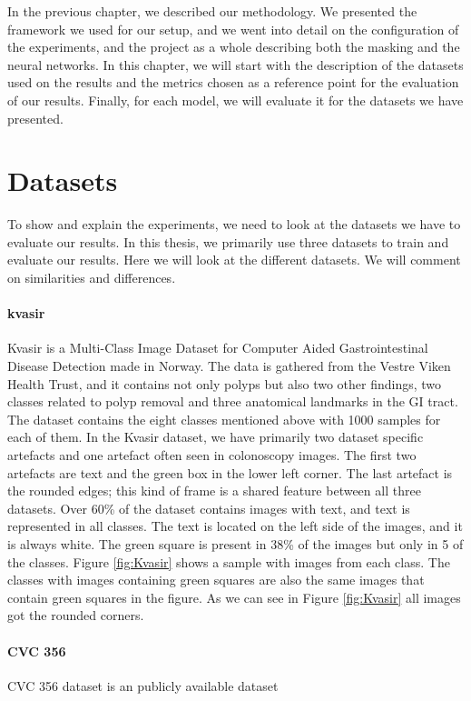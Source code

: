 In the previous chapter, we described our methodology. We presented the framework we used for our setup, and we went into detail on the configuration of the experiments, and the project as a whole describing both the masking and the neural networks. 
In this chapter, we will start with the description of the datasets used on the results and the metrics chosen as a reference point for the evaluation of our results. 
Finally, for each model, we will evaluate it for the datasets we have presented.

\section{Datasets}
To show and explain the experiments, we need to look at the datasets we have to evaluate our results. 
In this thesis, we primarily use three datasets to train and evaluate our results. Here we will look at the different datasets. We will comment on similarities and differences. 


\paragraph{kvasir}
Kvasir is a Multi-Class Image Dataset for Computer Aided Gastrointestinal Disease Detection made in Norway. The data is gathered from the Vestre Viken Health Trust, and it contains not only polyps but also two other findings, two classes related to polyp removal and three anatomical landmarks in the GI tract.
The dataset contains the eight classes mentioned above with 1000 samples for each of them.  In the Kvasir dataset, we have primarily two dataset specific artefacts and one artefact often seen in colonoscopy images. The first two artefacts are text and the green box in the lower left corner. The last artefact is the rounded edges; this kind of frame is a shared feature between all three datasets.
Over 60\% of the dataset contains images with text, and text is represented in all classes. The text is located on the left side of the images, and it is always white.
The green square is present in 38\% of the images but only in 5 of the classes. Figure \ref{fig:Kvasir} shows a sample with images from each class. The classes with images containing green squares are also the same images that contain green squares in the figure.
As we can see in Figure \ref{fig:Kvasir} all images got the rounded corners.


\paragraph{CVC 356}
CVC 356 dataset is an publicly available dataset

